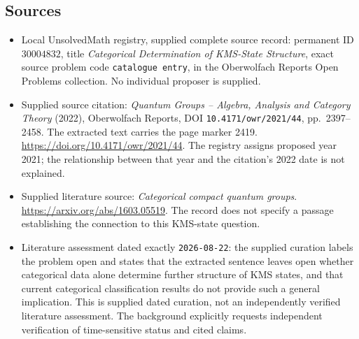 \documentclass[11pt]{article}
\begin{document}
\subsection{Sources}
\begin{itemize}
\item Local UnsolvedMath registry, supplied complete source record: permanent ID \(30004832\), title \emph{Categorical Determination of KMS-State Structure}, exact source problem code \texttt{catalogue entry}, in the Oberwolfach Reports Open Problems collection. No individual proposer is supplied.
\item Supplied source citation: \emph{Quantum Groups -- Algebra, Analysis and Category Theory} (2022), Oberwolfach Reports, DOI \texttt{10.4171/owr/2021/44}, pp.\ 2397--2458. The extracted text carries the page marker 2419. \url{https://doi.org/10.4171/owr/2021/44}. The registry assigns proposed year 2021; the relationship between that year and the citation's 2022 date is not explained.
\item Supplied literature source: \emph{Categorical compact quantum groups}. \url{https://arxiv.org/abs/1603.05519}. The record does not specify a passage establishing the connection to this KMS-state question.
\item Literature assessment dated exactly \texttt{2026-08-22}: the supplied curation labels the problem open and states that the extracted sentence leaves open whether categorical data alone determine further structure of KMS states, and that current categorical classification results do not provide such a general implication. This is supplied dated curation, not an independently verified literature assessment. The background explicitly requests independent verification of time-sensitive status and cited claims.
\end{itemize}
\end{document}
